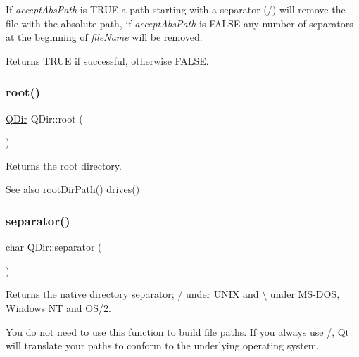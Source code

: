 If {\itshape accept\+Abs\+Path} is T\+R\+UE a path starting with a separator (\textquotesingle{}/\textquotesingle{}) will remove the file with the absolute path, if {\itshape accept\+Abs\+Path} is F\+A\+L\+SE any number of separators at the beginning of {\itshape file\+Name} will be removed.

Returns T\+R\+UE if successful, otherwise F\+A\+L\+SE. \mbox{\label{class_q_dir_a61d528e4d5689e81d9c27d68dbd19f64}} 
\subsubsection{\texorpdfstring{root()}{root()}}
{\footnotesize\ttfamily \mbox{\hyperlink{class_q_dir}{Q\+Dir}} Q\+Dir\+::root (\begin{DoxyParamCaption}{ }\end{DoxyParamCaption})\hspace{0.3cm}{\ttfamily [static]}}

Returns the root directory. \begin{DoxySeeAlso}{See also}
root\+Dir\+Path() drives() 
\end{DoxySeeAlso}
\mbox{\label{class_q_dir_a8e851d9a1f839208ef0141fde43b414d}} 
\subsubsection{\texorpdfstring{separator()}{separator()}}
{\footnotesize\ttfamily char Q\+Dir\+::separator (\begin{DoxyParamCaption}{ }\end{DoxyParamCaption})\hspace{0.3cm}{\ttfamily [static]}}

Returns the native directory separator; \textquotesingle{}/\textquotesingle{} under U\+N\+IX and \textquotesingle{}\textbackslash{}\textquotesingle{} under M\+S-\/\+D\+OS, Windows NT and O\+S/2.

You do not need to use this function to build file paths. If you always use \textquotesingle{}/\textquotesingle{}, Qt will translate your paths to conform to the underlying operating system. \mbox{\label{class_q_dir_a68d9e723870b5f8226353dc6047a35ee}} 
